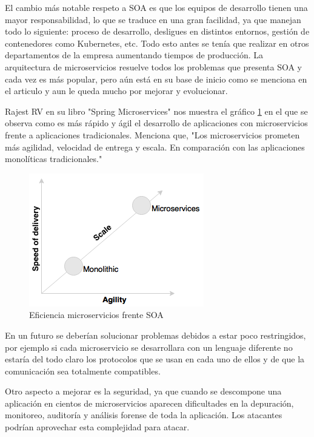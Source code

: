 \documentclass[12pt]{report} %
\begin{document}
El cambio más notable respeto a SOA es que los equipos de desarrollo tienen una mayor responsabilidad, lo que se traduce en una gran facilidad, ya que manejan todo lo siguiente:  proceso de desarrollo, desligues en distintos entornos, gestión de contenedores como Kubernetes, etc. Todo esto antes se tenía que realizar en otros departamentos de la empresa aumentando tiempos de producción. La arquitectura de microservicios resuelve todos los problemas que presenta SOA y cada vez es más popular, pero aún está en su base de inicio como se menciona en el articulo\cite{Dragoni2017} y aun le queda mucho por mejorar y evolucionar.
 
 
 
Rajest RV en su libro "Spring Microservices"\cite{rv2016spring} nos muestra el gráfico \ref{fig:desarrollomonovsmicro} en el que se observa como es más rápido y ágil el desarrollo de aplicaciones con microservicios frente a aplicaciones tradicionales. Menciona que, "Los microservicios prometen más agilidad, velocidad de entrega y escala. En comparación con las aplicaciones monolíticas tradicionales." 

\begin{figure}
	\centering
	\includegraphics[width=0.7\linewidth]{imagenes/desarrolloMonovsMicro}
	\caption{Eficiencia microservicios frente SOA}
	\label{fig:desarrollomonovsmicro}
\end{figure}

En un futuro se deberían solucionar problemas debidos a estar poco restringidos, por ejemplo si cada microservicio se desarrollara con un lenguaje diferente no estaría del todo claro los protocolos que se usan en cada uno de ellos y de que la comunicación sea totalmente compatibles. 

Otro aspecto a mejorar es la seguridad, ya que cuando se descompone una aplicación en cientos de microservicios aparecen dificultades en la depuración, monitoreo, auditoría y análisis forense de toda la aplicación. Los atacantes podrían aprovechar esta complejidad para atacar. 
\end{document}
